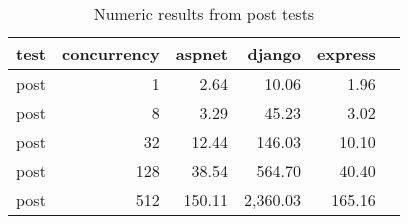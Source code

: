 \FloatBarrier
\begin{table}[!htp]\centering
    \caption{Numeric results from post tests}\label{tab:resultsPost}
    \scriptsize
    \begin{tabular}{lrrrrr}\toprule
        test & concurrency & aspnet & django   & express \\\midrule
post &1 &2.64 &10.06 &1.96 \\
post &8 &3.29 &45.23 &3.02 \\
post &32 &12.44 &146.03 &10.10 \\
post &128 &38.54 &564.70 &40.40 \\
post &512 &150.11 &2,360.03 &165.16 \\
        \bottomrule
    \end{tabular}
\end{table}
\FloatBarrier
